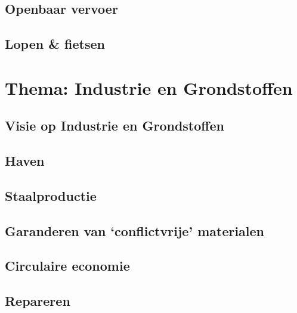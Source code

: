 \section{Openbaar vervoer}
\section{Lopen \& fietsen}

\chapter{Thema: Industrie en Grondstoffen}
\section*{Visie op Industrie en Grondstoffen}
\section{Haven}
\section{Staalproductie}
\section{Garanderen van `conflictvrije' materialen}
\section{Circulaire economie}
\section{Repareren}





